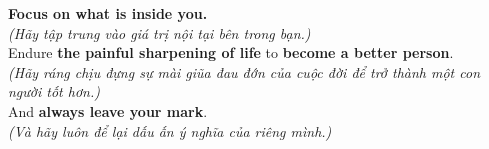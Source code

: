 \begin{baihoc}
  \textbf{Focus on what is inside you.}\\
  \textit{(Hãy tập trung vào giá trị nội tại bên trong bạn.)}\\
  Endure \textbf{the painful sharpening of life} to \textbf{become a better person}.\\
  \textit{(Hãy ráng chịu đựng sự mài giũa đau đớn của cuộc đời để trở thành một con người tốt hơn.)}\\
  And \textbf{always leave your mark}.\\
  \textit{(Và hãy luôn để lại dấu ấn ý nghĩa của riêng mình.)}
\end{baihoc}

\vspace{0.8cm}


\ngayDay{}

